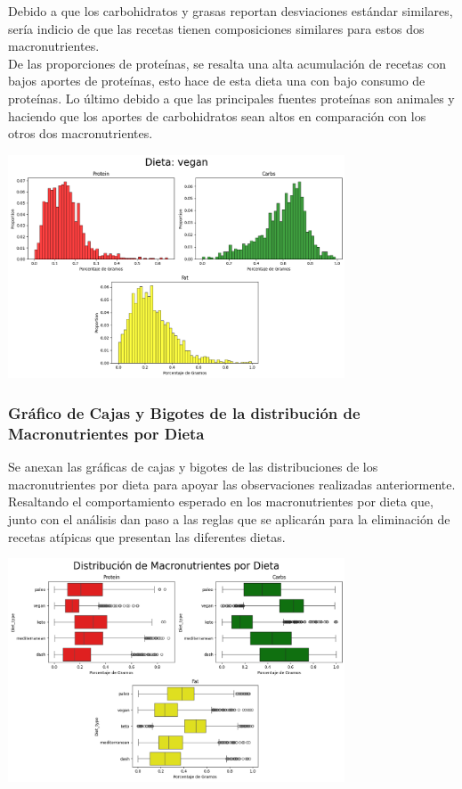 \documentclass[12pt,a4paper]{article}
\begin{document}
            Debido a que los carbohidratos y grasas reportan desviaciones estándar 
            similares, sería indicio de que las recetas tienen composiciones similares 
            para estos dos macronutrientes.\\

            De las proporciones de proteínas, se resalta una alta acumulación de 
            recetas con bajos aportes de proteínas, esto hace de esta dieta una 
            con bajo consumo de proteínas. Lo último debido a que las principales 
            fuentes proteínas son animales y haciendo que los aportes de carbohidratos 
            sean altos en comparación con los otros dos macronutrientes.

            \begin{center}
                \includegraphics[width=0.75\textwidth]{Resources/2_03_plot_05.png}
            \end{center}

        \subsubsection{Gráfico de Cajas y Bigotes de la distribución de Macronutrientes por Dieta}
            Se anexan las gráficas de cajas y bigotes de las distribuciones de los 
            macronutrientes por dieta para apoyar las observaciones realizadas anteriormente. 
            Resaltando el comportamiento esperado en los macronutrientes por dieta que, junto 
            con el análisis dan paso a las reglas que se aplicarán para la eliminación de recetas 
            atípicas que presentan las diferentes dietas.

            \begin{center}
                \includegraphics[width=0.75\textwidth]{Resources/2_03_plot_06.png}
            \end{center}

\newpage

\printbibliography[heading=bibintoc,title={Referencias Bibliográficas}]
\end{document}
